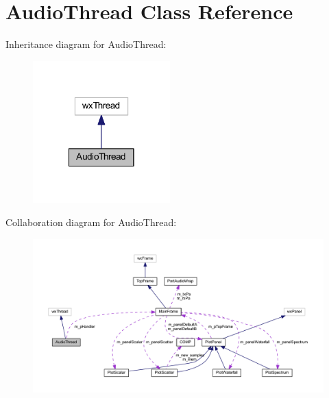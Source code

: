 \hypertarget{class_audio_thread}{\section{Audio\-Thread Class Reference}
\label{class_audio_thread}
}


Inheritance diagram for Audio\-Thread\-:\nopagebreak
\begin{figure}[H]
\begin{center}
\leavevmode
\includegraphics[width=150pt]{class_audio_thread__inherit__graph}
\end{center}
\end{figure}


Collaboration diagram for Audio\-Thread\-:\nopagebreak
\begin{figure}[H]
\begin{center}
\leavevmode
\includegraphics[width=350pt]{class_audio_thread__coll__graph}
\end{center}
\end{figure}
